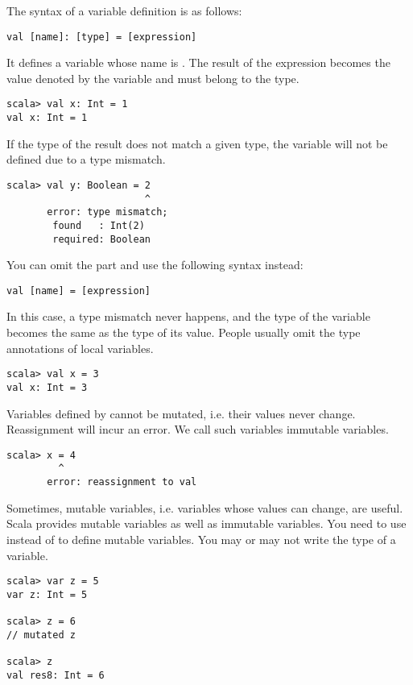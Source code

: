 The syntax of a variable definition is as follows:

\begin{verbatim}
val [name]: [type] = [expression]
\end{verbatim}

It defines a variable whose name is \code{[name]}.
The result of the expression becomes the value denoted by the variable and
must belong to the type.

\begin{verbatim}
scala> val x: Int = 1
val x: Int = 1
\end{verbatim}

If the type of the result does not match a given type, the variable will not be
defined due to a type mismatch.

\begin{verbatim}
scala> val y: Boolean = 2
                        ^
       error: type mismatch;
        found   : Int(2)
        required: Boolean
\end{verbatim}

You can omit the \code{: [type]} part and use the following syntax instead:

\begin{verbatim}
val [name] = [expression]
\end{verbatim}

In this case, a type mismatch never happens, and the
type of the variable becomes the same as the type of its value.
People usually omit the type annotations of local variables.

\begin{verbatim}
scala> val x = 3
val x: Int = 3
\end{verbatim}

Variables defined by  cannot be mutated, i.e. their values never
change. Reassignment will incur an error. We call such variables immutable
variables.

\begin{verbatim}
scala> x = 4
         ^
       error: reassignment to val
\end{verbatim}

Sometimes, mutable variables, i.e. variables whose values can change, are useful.
Scala provides mutable variables as well as immutable variables. You need to use
 instead of  to define mutable variables. You may or may not write
the type of a variable.

\begin{verbatim}
scala> var z = 5
var z: Int = 5

scala> z = 6
// mutated z

scala> z
val res8: Int = 6
\end{verbatim}

